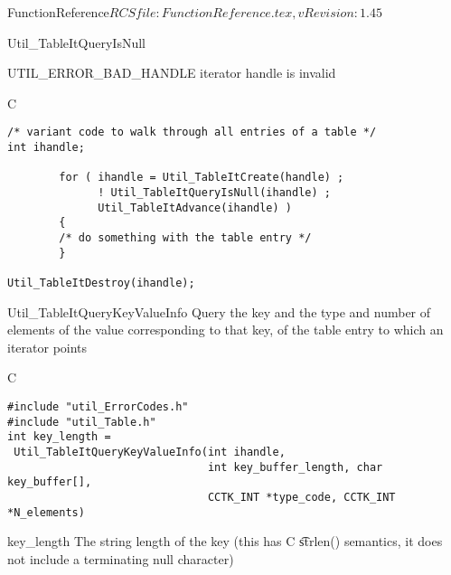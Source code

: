 \begin{cactuspart}{5}{FunctionReference}{$RCSfile: FunctionReference.tex,v $}{$Revision: 1.45 $}
\begin{FunctionDescription}{Util\_TableItQueryIsNull}
\begin{Error}{UTIL\_ERROR\_BAD\_HANDLE}
iterator handle is invalid
\end{Error}

\begin{Example}{C}
\begin{verbatim}
/* variant code to walk through all entries of a table */
int ihandle;

        for ( ihandle = Util_TableItCreate(handle) ;
              ! Util_TableItQueryIsNull(ihandle) ;
              Util_TableItAdvance(ihandle) )
        {
        /* do something with the table entry */
        }

Util_TableItDestroy(ihandle);
\end{verbatim}
\end{Example}
\end{FunctionDescription}


\begin{FunctionDescription}{Util\_TableItQueryKeyValueInfo}
\label{Util-TableItQueryKeyValueInfo}
Query the key and the type and number of elements of the value
corresponding to that key, of the table entry to which an iterator points

\begin{Synopsis}{C}
\begin{verbatim}
#include "util_ErrorCodes.h"
#include "util_Table.h"
int key_length =
 Util_TableItQueryKeyValueInfo(int ihandle,
                               int key_buffer_length, char key_buffer[],
                               CCTK_INT *type_code, CCTK_INT *N_elements)
\end{verbatim}
\end{Synopsis}

\begin{Result}{key\_length}
The string length of the key
(this has C {\t strlen()} semantics, \ie{} it does not
include a terminating null character)
\end{Result}


\end{FunctionDescription}
\end{cactuspart}
